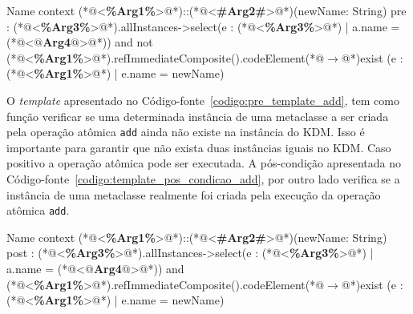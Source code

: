 \begin{codigo}[caption={[\textit{Template} OCL para realizar a pré-condição da operação atômica \texttt{add}.] \textit{Template} OCL para realizar a pré-condição da operação atômica \texttt{add}.},escapeinside={(*@}{@*)}, basicstyle=\footnotesize, label={codigo:pre_template_add}, language=OCL]{Name}
context (*@<\textbf{\%Arg1\%}>@*)::(*@<\textbf{\#Arg2\#}>@*)(newName: String)
pre : (*@<\textbf{\%Arg3\%}>@*).allInstances->select(e : (*@<\textbf{\%Arg3\%}>@*) | a.name = (*@<\textbf{$@$Arg4$@$}>@*)) and not (*@<\textbf{\%Arg1\%}>@*).refImmediateComposite().codeElement(*@$\rightarrow$@*)exist (e : (*@<\textbf{\%Arg1\%}>@*) | e.name = newName)
\end{codigo}

O \textit{template} apresentado no Código-fonte~\ref{codigo:pre_template_add}, tem como função verificar se uma determinada instância de uma metaclasse a ser criada pela operação atômica \texttt{add} ainda não existe na instância do KDM. Isso é importante para garantir que não exista duas instâncias iguais no KDM. Caso positivo a operação atômica pode ser executada. A pós-condição apresentada no Código-fonte~\ref{codigo:template_pos_condicao_add}, por outro lado verifica se a instância de uma metaclasse realmente foi criada pela execução da operação atômica \texttt{add}.

\begin{codigo}[caption={[\textit{Template} OCL para realizar a pós-condição da operação atômica \texttt{add}.] \textit{Template} OCL para realizar a pós-condição da operação atômica \texttt{add}.},escapeinside={(*@}{@*)}, basicstyle=\footnotesize, label={codigo:template_pos_condicao_add}, language=OCL]{Name}
context (*@<\textbf{\%Arg1\%}>@*)::(*@<\textbf{\#Arg2\#}>@*)(newName: String)
post : (*@<\textbf{\%Arg3\%}>@*).allInstances->select(e : (*@<\textbf{\%Arg3\%}>@*) | a.name = (*@<\textbf{$@$Arg4$@$}>@*)) and (*@<\textbf{\%Arg1\%}>@*).refImmediateComposite().codeElement(*@$\rightarrow$@*)exist (e : (*@<\textbf{\%Arg1\%}>@*) | e.name = newName)
\end{codigo}

